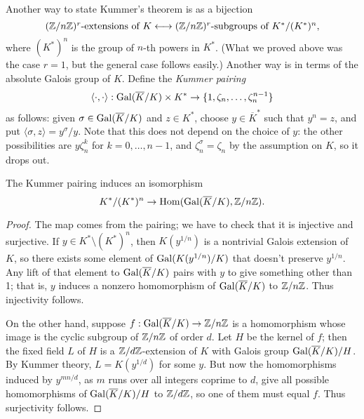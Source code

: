 Another way to state Kummer's theorem is as a bijection
\[
\mbox{$(\mathbb{Z}/n\mathbb{Z})^r$-extensions of $K$} \longleftrightarrow
\mbox{$(\mathbb{Z}/n\mathbb{Z})^r$-subgroups of $K^*/(K^*)^n$},
\]
where $(K^*)^n$ is the group of $n$-th powers in $K^*$.
(What we proved above was the case $r=1$, but the general case follows easily.)
Another way is in terms of the absolute Galois group of $K$.
Define the \emph{Kummer pairing}
\[
\langle \cdot, \cdot \rangle:
\operatorname{Gal}(\overline{K}/K) \times K^* \to \{1, \zeta_n, \dots, \zeta_n^{n-1} \}
\]
as follows: given $\sigma \in \operatorname{Gal}(\overline{K}/K)$
and $z \in K^*$, choose $y \in \overline{K}^*$ such that $y^n = z$,
and put $\langle \sigma, z \rangle = y^\sigma/y$. Note that this does not
depend on the choice of $y$: the other possibilities are $y \zeta_n^k$
for $k=0, \dots, n-1$, and $\zeta_n^\sigma = \zeta_n$ by the assumption
on $K$, so it drops out.

\begin{theorem} \label{T:Kummer reformulated}
The Kummer pairing induces an isomorphism
\[
K^*/(K^*)^n \to \operatorname{Hom}(\operatorname{Gal}(\overline{K}/K), \mathbb{Z}/n\mathbb{Z}).
\]
\end{theorem}
\begin{proof}
The map comes from the pairing; we have to check that it is injective and
surjective. If $y \in K^* \setminus (K^*)^n$, then $K(y^{1/n})$ is a nontrivial
Galois extension of $K$, so there exists some element of
$\operatorname{Gal}(K(y^{1/n})/K)$ that doesn't preserve $y^{1/n}$. Any lift of
that element to $\operatorname{Gal}(\overline{K}/K)$ pairs with $y$ to give something
other than 1; that is, $y$ induces a nonzero homomorphism of
$\operatorname{Gal}(\overline{K}/K)$ to $\mathbb{Z}/n\mathbb{Z}$. Thus injectivity follows.

On the other hand, suppose $f: \operatorname{Gal}(\overline{K}/K) \to \mathbb{Z}/n\mathbb{Z}$ is a
homomorphism whose image is the cyclic subgroup of $\mathbb{Z}/n\mathbb{Z}$ of order $d$.
Let $H$ be the kernel of $f$; then the fixed field $L$ of $H$ is
a $\mathbb{Z}/d\mathbb{Z}$-extension of $K$ with Galois group $\operatorname{Gal}(\overline{K}/K)/H$.
By Kummer theory, $L = K(y^{1/d})$ for some $y$. But now the homomorphisms
induced by $y^{mn/d}$, as $m$ runs over all integers coprime to $d$,
give all possible homomorphisms of $\operatorname{Gal}(\overline{K}/K)/H$ to $\mathbb{Z}/d\mathbb{Z}$,
so one of them must equal $f$. Thus surjectivity follows.
\end{proof}

